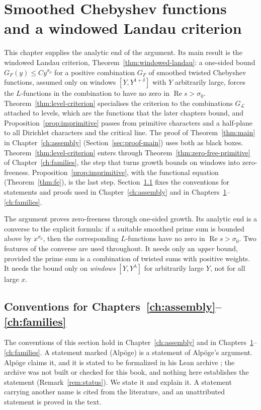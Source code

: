 \documentclass[11pt]{amsbook}
\theoremstyle{plain}
\theoremstyle{definition}
\theoremstyle{remark}
\numberwithin{equation}{section}
\numberwithin{figure}{chapter}
\numberwithin{table}{chapter}
\newcommand{\lev}{\mathscr{L}}
\begin{document}
\chapter{Smoothed Chebyshev functions and a windowed Landau criterion}
\label{ch:landau}\label{sec:landau}

This chapter supplies the analytic end of the argument. Its main
result is the windowed Landau criterion,
Theorem~\ref{thm:windowed-landau}: a one-sided bound
$G_F(y)\le Cy^{\sigma_0}$ for a positive combination $G_F$ of
smoothed twisted Chebyshev functions, assumed only on windows
$[Y,Y^{1+\delta}]$ with $Y$ arbitrarily large, forces the
$L$-functions in the combination to have no zero in
$\operatorname{Re}s>\sigma_0$. Theorem~\ref{thm:level-criterion}
specialises the criterion to the combinations $G_\lev$ attached to
levels, which are the functions that the later chapters bound, and
Proposition~\ref{prop:imprimitive} passes from primitive characters
and a half-plane to all Dirichlet characters and the critical line.
The proof of Theorem~\ref{thm:main} in
Chapter~\ref{ch:assembly} (Section~\ref{sec:proof-main}) uses both
as black boxes. Theorem~\ref{thm:level-criterion} enters through
Theorem~\ref{thm:zero-free-primitive} of Chapter~\ref{ch:families},
the step that turns growth bounds on windows into zero-freeness.
Proposition~\ref{prop:imprimitive}, with the functional equation
(Theorem~\ref{thm:fe}), is the last step.
Section~\ref{sec:conventions} fixes the conventions for statements
and proofs used in Chapter~\ref{ch:assembly} and in
Chapters~\ref{ch:landau}--\ref{ch:families}.

The argument proves zero-freeness through one-sided growth. Its
analytic end is a converse to the explicit formula: if a suitable
smoothed prime sum is bounded above by $x^{\sigma_0}$, then the
corresponding $L$-functions have no zero in $\operatorname{Re}s>
\sigma_0$. Two features of the converse are used throughout. It needs
only an \emph{upper} bound, provided
the prime sum is a combination of twisted sums with positive weights.
It needs the bound only on \emph{windows} $[Y,Y^\lambda]$ for
arbitrarily large $Y$, not for all large $x$.

\section[Conventions]%
{Conventions for Chapters~\ref{ch:assembly}--\ref{ch:families}}
\label{sec:conventions}

The conventions of this section hold in Chapter~\ref{ch:assembly}
and in Chapters~\ref{ch:landau}--\ref{ch:families}.
A statement marked (Alp\"oge) is a statement of
Alp\"oge's argument. Alp\"oge claims it, and it is stated to be
formalized in his Lean archive \cite{AlpogeArchive2026}; the
archive was not built or checked for this book, and nothing here
establishes the statement (Remark~\ref{rem:status}). We state it
and explain it. A statement
carrying another name is cited from the literature, and an
unattributed statement is proved in the text.
\end{document}
